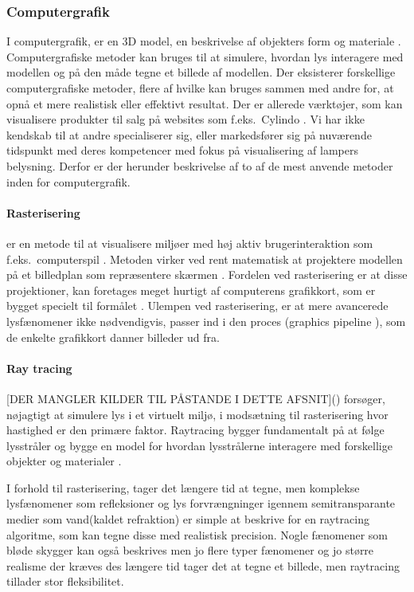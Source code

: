 \subsubsection{Computergrafik}
\label{sec:computergrafik}
I computergrafik, er en 3D model, en beskrivelse af objekters form og materiale \cite{computergrafik_introduktion}. Computergrafiske metoder kan bruges til at simulere, hvordan lys interagere med modellen og på den måde tegne et billede af modellen. Der eksisterer forskellige computergrafiske metoder, flere af hvilke kan bruges sammen med andre for, at opnå et mere realistisk eller effektivt resultat. Der er allerede værktøjer, som kan visualisere produkter til salg på websites som f.eks.\ Cylindo \cite{Cylindo}. Vi har ikke kendskab til at andre specialiserer sig, eller markedsfører sig på nuværende tidspunkt med deres kompetencer med fokus på visualisering af lampers belysning. Derfor er der herunder beskrivelse af to af de mest anvende metoder inden for computergrafik.

\paragraph{Rasterisering}
er en metode til at visualisere miljøer med høj aktiv brugerinteraktion som f.eks.\ computerspil \cite{rastarization}. Metoden virker ved rent matematisk at projektere modellen på et billedplan som repræsentere skærmen \cite{rastarization}. Fordelen ved rasterisering er at disse projektioner, kan foretages meget hurtigt af computerens grafikkort, som er bygget specielt til formålet \cite{rastarization}. Ulempen ved rasterisering, er at mere avancerede lysfænomener ikke nødvendigvis, passer ind i den proces (graphics pipeline \cite{rastarization}), som de enkelte grafikkort danner billeder ud fra. 

\paragraph{Ray tracing} [DER MANGLER KILDER TIL PÅSTANDE I DETTE AFSNIT]() forsøger, nøjagtigt at simulere lys i et virtuelt miljø, i modsætning til rasterisering hvor hastighed er den primære faktor. Raytracing bygger fundamentalt på at følge lysstråler og bygge en model for hvordan lysstrålerne interagere med forskellige objekter og materialer \cite{raytracing_for_begyndere}. 

I forhold til rasterisering, tager det længere tid at tegne, men komplekse lysfænomener som refleksioner og lys forvrængninger igennem semitransparante medier som vand(kaldet refraktion) er simple at beskrive for en raytracing algoritme, som kan tegne disse med realistisk precision. Nogle fænomener som bløde skygger kan også beskrives men jo flere typer fænomener og jo større realisme der kræves des længere tid tager det at tegne et billede, men raytracing tillader stor fleksibilitet.